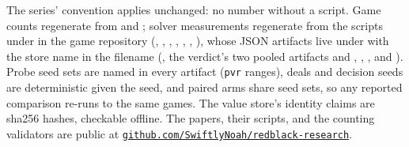 \documentclass[11pt]{article}
\theoremstyle{plain}
\theoremstyle{definition}
\theoremstyle{remark}
\newcommand{\code}[1]{\texttt{\small #1}}
\begin{document}
\begin{sloppypar}
The series' convention applies unchanged: no number without a script.
Game counts regenerate from  and
 \cite{rb1}; solver measurements regenerate from
the scripts under  in the game repository
(, , ,
, ,
, ), whose JSON artifacts live under
 with the store name in the filename
(, the verdict's two pooled
artifacts
 and
,
, , and
). Probe seed sets are
named in every artifact (\code{pvr} ranges), deals and decision seeds
are deterministic given the seed, and paired arms share seed sets, so
any reported comparison re-runs to the same games. The value store's
identity claims are sha256 hashes, checkable offline. The papers,
their scripts, and the counting validators are public at
\href{https://github.com/SwiftlyNoah/redblack-research}%
{\code{github.com/SwiftlyNoah/redblack-research}}.
\end{sloppypar}
\end{document}
